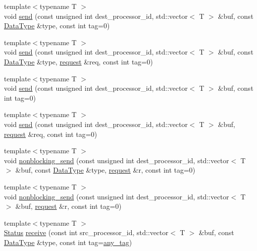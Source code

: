 \begin{DoxyCompactItemize}
\item 
{\footnotesize template$<$typename T $>$ }\\void \mbox{\hyperlink{namespacefemus_1_1_parallel_a3126d0149eca349995ce4f5a314e3a89}{send}} (const unsigned int dest\+\_\+processor\+\_\+id, std\+::vector$<$ T $>$ \&buf, const \mbox{\hyperlink{classfemus_1_1_parallel_1_1_data_type}{Data\+Type}} \&type, const int tag=0)
\item 
{\footnotesize template$<$typename T $>$ }\\void \mbox{\hyperlink{namespacefemus_1_1_parallel_a9e7ecc622b087c99acc5c1b37b6e6c90}{send}} (const unsigned int dest\+\_\+processor\+\_\+id, std\+::vector$<$ T $>$ \&buf, const \mbox{\hyperlink{classfemus_1_1_parallel_1_1_data_type}{Data\+Type}} \&type, \mbox{\hyperlink{structfemus_1_1_parallel_1_1request}{request}} \&req, const int tag=0)
\item 
{\footnotesize template$<$typename T $>$ }\\void \mbox{\hyperlink{namespacefemus_1_1_parallel_a5f272a5537ade03af5151accf483464c}{send}} (const unsigned int dest\+\_\+processor\+\_\+id, std\+::vector$<$ T $>$ \&buf, const int tag=0)
\item 
{\footnotesize template$<$typename T $>$ }\\void \mbox{\hyperlink{namespacefemus_1_1_parallel_ad9fff04a83c0fb27ed2f48ba4bd75245}{send}} (const unsigned int dest\+\_\+processor\+\_\+id, std\+::vector$<$ T $>$ \&buf, \mbox{\hyperlink{structfemus_1_1_parallel_1_1request}{request}} \&req, const int tag=0)
\item 
{\footnotesize template$<$typename T $>$ }\\void \mbox{\hyperlink{namespacefemus_1_1_parallel_a828c554bd96aecbb61a9da71e2f2f73b}{nonblocking\+\_\+send}} (const unsigned int dest\+\_\+processor\+\_\+id, std\+::vector$<$ T $>$ \&buf, const \mbox{\hyperlink{classfemus_1_1_parallel_1_1_data_type}{Data\+Type}} \&type, \mbox{\hyperlink{structfemus_1_1_parallel_1_1request}{request}} \&r, const int tag=0)
\item 
{\footnotesize template$<$typename T $>$ }\\void \mbox{\hyperlink{namespacefemus_1_1_parallel_a017efec3821f7b00b3a6839648a751d8}{nonblocking\+\_\+send}} (const unsigned int dest\+\_\+processor\+\_\+id, std\+::vector$<$ T $>$ \&buf, \mbox{\hyperlink{structfemus_1_1_parallel_1_1request}{request}} \&r, const int tag=0)
\item 
{\footnotesize template$<$typename T $>$ }\\\mbox{\hyperlink{classfemus_1_1_parallel_1_1_status}{Status}} \mbox{\hyperlink{namespacefemus_1_1_parallel_a308546b3fc2d590d954da95d8f9e089c}{receive}} (const int src\+\_\+processor\+\_\+id, std\+::vector$<$ T $>$ \&buf, const \mbox{\hyperlink{classfemus_1_1_parallel_1_1_data_type}{Data\+Type}} \&type, const int tag=\mbox{\hyperlink{namespacefemus_1_1_parallel_a928996065f46cb52e89e132cdcb30328}{any\+\_\+tag}})

\end{DoxyCompactItemize}
